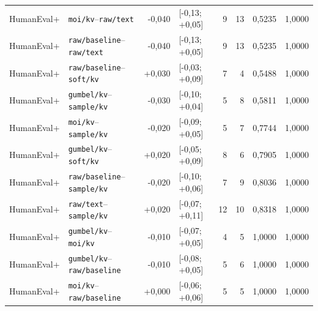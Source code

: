 \begin{longtable}{llrlrrrr}
HumanEval+ & \texttt{moi/kv}--\texttt{raw/text} & -0,040 & [-0,13; +0,05] & 9 & 13 & 0,5235 & 1,0000 \\
HumanEval+ & \texttt{raw/baseline}--\texttt{raw/text} & -0,040 & [-0,13; +0,05] & 9 & 13 & 0,5235 & 1,0000 \\
HumanEval+ & \texttt{raw/baseline}--\texttt{soft/kv} & +0,030 & [-0,03; +0,09] & 7 & 4 & 0,5488 & 1,0000 \\
HumanEval+ & \texttt{gumbel/kv}--\texttt{sample/kv} & -0,030 & [-0,10; +0,04] & 5 & 8 & 0,5811 & 1,0000 \\
HumanEval+ & \texttt{moi/kv}--\texttt{sample/kv} & -0,020 & [-0,09; +0,05] & 5 & 7 & 0,7744 & 1,0000 \\
HumanEval+ & \texttt{gumbel/kv}--\texttt{soft/kv} & +0,020 & [-0,05; +0,09] & 8 & 6 & 0,7905 & 1,0000 \\
HumanEval+ & \texttt{raw/baseline}--\texttt{sample/kv} & -0,020 & [-0,10; +0,06] & 7 & 9 & 0,8036 & 1,0000 \\
HumanEval+ & \texttt{raw/text}--\texttt{sample/kv} & +0,020 & [-0,07; +0,11] & 12 & 10 & 0,8318 & 1,0000 \\
HumanEval+ & \texttt{gumbel/kv}--\texttt{moi/kv} & -0,010 & [-0,07; +0,05] & 4 & 5 & 1,0000 & 1,0000 \\
HumanEval+ & \texttt{gumbel/kv}--\texttt{raw/baseline} & -0,010 & [-0,08; +0,05] & 5 & 6 & 1,0000 & 1,0000 \\
HumanEval+ & \texttt{moi/kv}--\texttt{raw/baseline} & +0,000 & [-0,06; +0,06] & 5 & 5 & 1,0000 & 1,0000 \\
\hline
\end{longtable}
